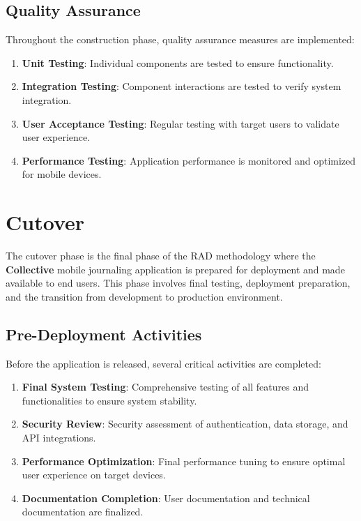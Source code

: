 \subsection{Quality Assurance}\label{subsec:qualityAssurance}

Throughout the construction phase, quality assurance measures are implemented:

\begin{enumerate}
    \item \textbf{Unit Testing}: Individual components are tested to ensure functionality.
    
    \item \textbf{Integration Testing}: Component interactions are tested to verify system integration.
    
    \item \textbf{User Acceptance Testing}: Regular testing with target users to validate user experience.
    
    \item \textbf{Performance Testing}: Application performance is monitored and optimized for mobile devices.
\end{enumerate}

\section{Cutover}\label{sec:cutover}

The cutover phase is the final phase of the RAD methodology where the \textbf{Collective} mobile journaling application is prepared for deployment and made available to end users. This phase involves final testing, deployment preparation, and the transition from development to production environment.

\subsection{Pre-Deployment Activities}\label{subsec:preDeployment}

Before the application is released, several critical activities are completed:

\begin{enumerate}
    \item \textbf{Final System Testing}: Comprehensive testing of all features and functionalities to ensure system stability.
    
    \item \textbf{Security Review}: Security assessment of authentication, data storage, and API integrations.
    
    \item \textbf{Performance Optimization}: Final performance tuning to ensure optimal user experience on target devices.
    
    \item \textbf{Documentation Completion}: User documentation and technical documentation are finalized.
\end{enumerate}

